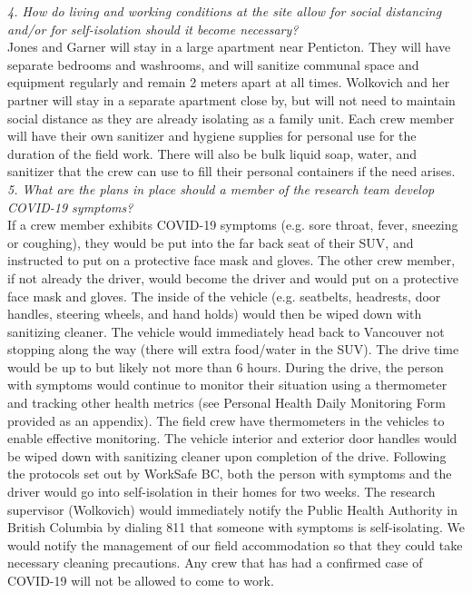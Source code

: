 \documentclass[11pt,letter]{article}
\begin{document}
\emph{4. How do living and working conditions at the site allow for social distancing and/or for self-isolation should it become necessary?}\\
Jones and Garner will stay in a large apartment near Penticton. They will have separate bedrooms and washrooms, and will sanitize communal space and equipment regularly and remain 2 meters apart at all times. Wolkovich and her partner will stay in a separate apartment close by, but will not need to maintain social distance as they are already isolating as a family unit. Each crew member will have their own sanitizer and hygiene supplies for personal use for the duration of the field work. There will also be bulk liquid soap, water, and sanitizer that the crew can use to fill their personal containers if the need arises.\\

\emph{5. What are the plans in place should a member of the research team develop COVID-19 symptoms?}\\
If a crew member exhibits COVID-19 symptoms (e.g. sore throat, fever, sneezing or coughing), they would be put into the far back seat of their SUV, and instructed to put on a protective face mask and gloves. The other crew member, if not already the driver, would become the driver and would put on a protective face mask and gloves. The inside of the vehicle (e.g. seatbelts, headrests, door handles, steering wheels, and hand holds) would then be wiped down with sanitizing cleaner. The vehicle would immediately head back to Vancouver not stopping along the way (there will extra food/water in the SUV). The drive time would be up to but likely not more than 6 hours. During the drive, the person with symptoms would continue to monitor their situation using a thermometer and tracking other health metrics (see Personal Health Daily Monitoring Form provided as an appendix). The field crew have thermometers in the vehicles to enable effective monitoring. The vehicle interior and exterior door handles would be wiped down with sanitizing cleaner upon completion of the drive. Following the protocols set out by WorkSafe BC, both the person with symptoms and the driver would go into self-isolation in their homes for two weeks. The research supervisor (Wolkovich) would immediately notify the Public Health Authority in British Columbia by dialing 811 that someone with symptoms is self-isolating. We would notify the management of our field accommodation so that they could take necessary cleaning precautions. Any crew that has had a confirmed case of COVID-19 will not be allowed to come to work.\\
\end{document}
